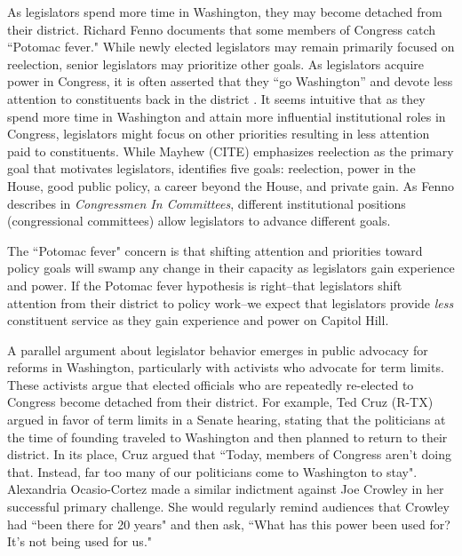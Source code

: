 \documentclass[12pt]{article}
\begin{document}
As legislators spend more time in Washington, they may become detached from their district. Richard Fenno documents that some members of Congress catch ``Potomac fever." While newly elected legislators may remain primarily focused on reelection, senior legislators may prioritize other goals. As legislators acquire power in Congress, it is often asserted that they ``go Washington'' and devote less attention to constituents back in the district \citep{Fenno1978}. It seems intuitive that as they spend more time in Washington and attain more influential institutional roles in Congress, legislators might focus on other priorities resulting in less attention paid to constituents.  While Mayhew (CITE) emphasizes reelection as the primary goal that motivates legislators, \citet{Fenno1973} identifies five goals: reelection, power in the House, good public policy, a career beyond the House, and private gain. As Fenno describes in \textit{Congressmen In Committees}, different institutional positions (congressional committees) allow legislators to advance different goals. %

The ``Potomac fever" concern is that shifting attention and priorities toward policy goals will swamp any change in their capacity as legislators gain experience and power. If the Potomac fever hypothesis is right--that legislators shift attention from their district to policy work--we expect that legislators provide \textit{less} constituent service as they gain experience and power on Capitol Hill. 


A parallel argument about legislator behavior emerges in public advocacy for reforms in Washington, particularly with activists who advocate for term limits. These activists argue that elected officials who are repeatedly re-elected to Congress become detached from their district. For example, Ted Cruz (R-TX) argued in favor of term limits in a Senate hearing, stating that the politicians at the time of founding traveled to Washington and then planned to return to their district. In its place, Cruz argued that ``Today, members of Congress aren't doing that. Instead, far too many of our politicians come to Washington to stay". Alexandria Ocasio-Cortez made a similar indictment against Joe Crowley in her successful primary challenge. She would regularly remind audiences that Crowley had ``been there for 20 years" and then ask, ``What has this power been used for? It's not being used for us." %
\end{document}
